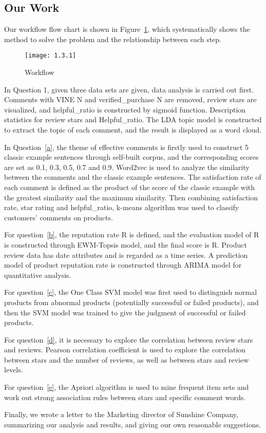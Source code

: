 \documentclass[../mcmpaper]{subfiles}
\begin{document}
    \subsection{Our Work}
    Our workflow flow chart is shown in Figure~\ref{fig:1.3.1}, which systematically shows the method to solve the problem and the relationship between each step.
    \begin{figure}[!ht]
    \centering
    \texttt{[image: 1.3.1]}
    \caption{Workflow}\label{fig:1.3.1}
    \end{figure}
    \par
    In Question 1, given three data sets are given, data analysis is carried out first. Comments with VINE N and verified\_purchase N are removed, review stars are visualized, and helpful\_ratio is constructed by sigmoid function. Description statistics for review stars and Helpful\_ratio. The LDA topic model is constructed to extract the topic of each comment, and the result is displayed as a word cloud.
    \par
    In Question~\ref{a}, the theme of effective comments is firstly used to construct 5 classic example sentences through self-built corpus, and the corresponding scores are set as 0.1, 0.3, 0.5, 0.7 and 0.9. Word2vec is used to analyze the similarity between the comments and the classic example sentences. The satisfaction rate of each comment is defined as the product of the score of the classic example with the greatest similarity and the maximum similarity. Then combining satisfaction rate, star rating and helpful\_ratio, k-means algorithm was used to classify customers' comments on products.
    \par
    For question~\ref{b}, the reputation rate R is defined, and the evaluation model of R is constructed through EWM-Topsis model, and the final score is R. Product review data has date attributes and is regarded as a time series. A prediction model of product reputation rate is constructed through ARIMA model for quantitative analysis.
    \par
    For question~\ref{c}, the One Class SVM model was first used to distinguish normal products from abnormal products (potentially successful or failed products), and then the SVM model was trained to give the judgment of successful or failed products.
    \par
    For question~\ref{d}, it is necessary to explore the correlation between review stars and reviews. Pearson correlation coefficient is used to explore the correlation between stars and the number of reviews, as well as between stars and review levels.
    \par
    For question~\ref{e}, the Apriori algorithm is used to mine frequent item sets and work out strong association rules between stars and specific comment words.
    \par
    Finally, we wrote a letter to the Marketing director of Sunshine Company, summarizing our analysis and results, and giving our own reasonable suggestions.
\end{document}
